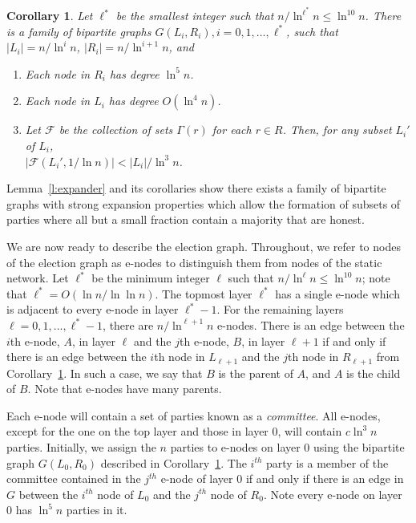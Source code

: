 \documentclass[11pt,letter]{article}
\theoremstyle{mytheoremstyle}
\newtheorem{corollary}{Corollary}
\newcommand{\toplev}{\ell^*}
\newcommand{\lev}{\ell}
\begin{document}
\begin{corollary}
	\label{l:expander graph family}  Let $\toplev$ be the smallest integer such that $n/\ln^{\toplev} n \le \ln^{10} n$. There is a family of bipartite graphs $G(L_i, R_i), i=0,1,\ldots, \toplev$, such that $|L_{i}| = n/\ln^{i} n$, $|R_{i}|=n/\ln^{i+1} n$, and
	
	\begin{enumerate}		
		\item Each node in $R_i$ has degree $\ln^5 n$.		
		\item Each node in $L_{i}$ has degree $O(\ln^4 n)$.		
		\item Let $\mathcal{F}$ be the collection of sets $\Gamma(r)$ for each $r \in R$. Then, for any subset $L_i'$ of $L_i$,\\
		$|\mathcal{F}(L_i', 1/\ln n )| < |L_i|/\ln^{3} n$.		
	\end{enumerate}
	
\end{corollary}

Lemma~\ref{l:expander} and its corollaries show there exists a family of bipartite graphs with strong expansion properties which allow the formation of subsets of parties where all but a small fraction contain a majority that are honest.

We are now ready to describe the election graph. Throughout, we refer to nodes of the election graph as \textsf{e-node}s to distinguish them from nodes of the static network. Let $\toplev$ be the minimum integer $\lev$ such that $n/\ln^\lev n \leq \ln^{10} n$; note that $\toplev = O(\ln n/\ln\ln n)$. The topmost layer $\toplev$ has a single \textsf{e-node} which is adjacent to every \textsf{e-node} in layer $\toplev -1$. For the remaining layers $\lev=0,1,...,\toplev-1$, there are $n/\ln^{\lev+1}n$ \textsf{e-node}s. There is an edge between the $i$th \textsf{e-node}, $A$,  in layer $\lev$ and the $j$th \textsf{e-node}, $B$, in layer $\lev+1$ if and only if there is an edge between the $i$th node in $L_{\lev+1}$ and the $j$th node in $R_{\lev+1}$ from Corollary~\ref{l:expander graph family}. In such a case, we say that $B$ is the parent of $A$, and $A$ is the child of $B$. Note that \textsf{e-node}s have many parents.

Each \textsf{e-node} will contain a set of parties known as a {\it committee}. All \textsf{e-node}s, except for the one on the top layer and those in layer 0, will contain $c\ln^3 n$ parties. Initially, we assign the $n$ parties to \textsf{e-node}s on layer $0$ using the bipartite graph $G(L_0,R_0)$ described in Corollary~\ref{l:expander graph family}. The $i^{th}$ party is a member of the committee contained in the $j^{th}$ \textsf{e-node} of layer 0 if and only if there is an edge in $G$ between the $i^{th}$ node of $L_0$ and the $j^{th}$ node of $R_0$. Note every \textsf{e-node} on layer 0 has $\ln^5 n$ parties in it.
\end{document}
